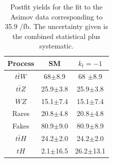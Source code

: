 \begin{table}[ht!]
	\centering
	\caption{Postfit  yields for the fit to the Asimov data corresponding to 35.9 /fb. The uncertainty given is the combined statistical plus systematic.}
\begin{tabular}{ccc}
	\hline
	Process  & SM    & $k_t=-1$ \\
	\hline
$t\bar{t}W$  &  68$\pm$8.9& 68 $\pm$8.9 \\
	$t\bar{t}Z$  & 25.9$\pm$3.8&25.9$\pm$3.8\\
$WZ$ &  15.1$\pm$7.4& 15.1$\pm$7.4\\
Rares &  20.8$\pm$4.8& 20.8$\pm$4.8 \\
	Fakes  &  80.9$\pm$9.0&  80.9$\pm$8.9 \\
	$t\bar{t}H$  &   24.2$\pm$2.0 &  24.2$\pm$2.0 \\
\hline
$tH$&  2.1$\pm$16.5 &26.2$\pm$13.1 
\end{tabular}
\label{table1}
\end{table}

